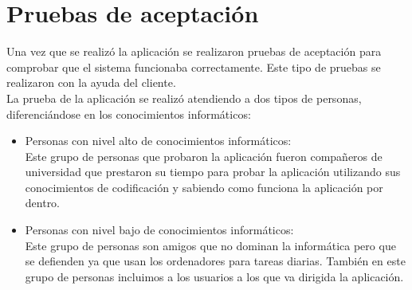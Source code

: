 \section {Pruebas de aceptación}

Una vez que se realizó la aplicación se realizaron pruebas de aceptación para comprobar que el sistema funcionaba correctamente. Este tipo de pruebas se realizaron con la ayuda del cliente.\\
La prueba de la aplicación se realizó atendiendo a dos tipos de personas, diferenciándose en los conocimientos informáticos:

\begin{itemize}
\item Personas con nivel alto de conocimientos informáticos:\\
Este grupo de personas que probaron la aplicación fueron compañeros de universidad que prestaron su tiempo para probar la aplicación utilizando sus conocimientos de codificación y sabiendo como funciona la aplicación por dentro.

\item Personas con nivel bajo de conocimientos informáticos:\\
Este grupo de personas son amigos que no dominan la informática pero que se defienden ya que usan los ordenadores para tareas diarias. También en este grupo de personas incluimos a los usuarios a los que va dirigida la aplicación.
\end{itemize}








